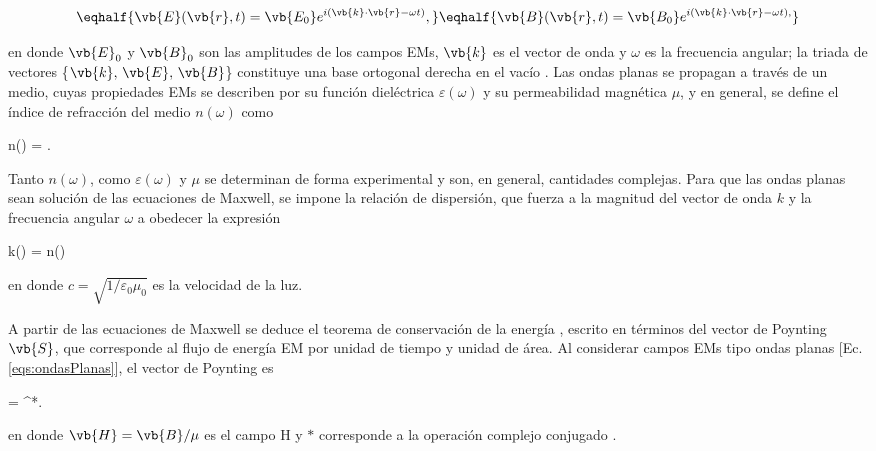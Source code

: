 	\begin{subequations}\eqhalf{\vb{E}(\vb{r},t) =\vb{E_0}e^{i(\vb{k}\cdot\vb{r} -\omega t)},}
	\eqhalf{\vb{B}(\vb{r}, t) =\vb{B_0}e^{i(\vb{k}\cdot\vb{r} -\omega t),}}	
	\label{eqs:ondasPlanas}\end{subequations}\vspace*{-1em}
		
\noindent en donde  $\vb{E}_0$ y $\vb{B}_0$ son las amplitudes de los campos EMs, $\vb{k}$ es el vector de onda y $\omega$ es la frecuencia angular; la triada de vectores \{$\vb{k},\, \vb{E},\, \vb{B}$\} constituye una base ortogonal derecha en el vacío \cite{griffiths2013electrodynamics}. Las ondas planas se propagan a través de un medio, cuyas propiedades EMs se describen por su función dieléctrica $\varepsilon(\omega)$ y su permeabilidad magnética $\mu$, y en general, se define el índice de refracción del medio $n(\omega)$ como \vspace*{-.75em}
%
	\begin{tcolorbox}[title = Índice de refracción, ams align]
	n(\omega) = .
		\label{eq:indice} 
	\end{tcolorbox}\vspace*{-.75em}\noindent
%
Tanto $n(\omega)$, como $\varepsilon(\omega)$ y $\mu$ se determinan de forma experimental y son, en general, cantidades complejas. Para que las ondas planas sean solución de las ecuaciones de Maxwell, se impone la relación de dispersión, que fuerza a  la magnitud del vector de onda $k$ y la frecuencia angular $\omega$ a obedecer la expresión \vspace*{-.75em}
%
	\begin{tcolorbox}[title = Relación de dispersión, ams align]
	k(\omega) = n(\omega)
	\label{eq:dispersion}
	\end{tcolorbox}\vspace*{-.75em}\noindent
%
en donde  $c=\sqrt{1/\varepsilon_0\mu_0}$ es la velocidad de la luz.

A partir de las ecuaciones de Maxwell se deduce el teorema de conservación de la energía \cite{griffiths2013electrodynamics}, escrito en términos del vector de Poynting $\vb{S}$, que corresponde al flujo de energía EM por unidad de tiempo y unidad de área. Al considerar campos EMs tipo ondas planas [Ec. \eqref{eqs:ondasPlanas}], el vector de Poynting es \vspace*{-.75em}
%
	\begin{tcolorbox}[title = Vector de Poynting considerando ondas planas, ams align]
	 = \times{}^*.  \label{eq:Poynting}
	\end{tcolorbox} \vspace*{-.75em}\noindent
%
en donde $\vb{H}=\vb{B}/\mu$ es el campo H y $*$ corresponde a la operación complejo conjugado \cite{hecht1998optics}.

